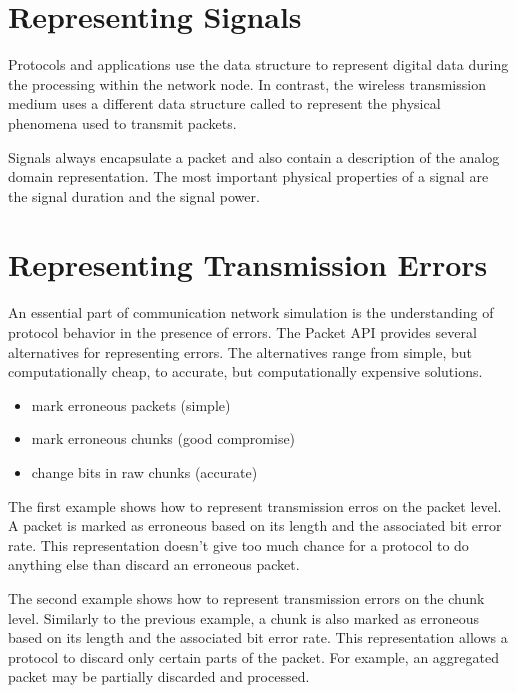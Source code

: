 
\section{Representing Signals}
\label{sec:packets:representing-signals}

Protocols and applications use the  data structure to represent
digital data during the processing within the network node. In contrast, the
wireless transmission medium uses a different data structure called
 to represent the physical phenomena used to transmit packets.


Signals always encapsulate a packet and also contain a description of the analog
domain representation. The most important physical properties of a signal are
the signal duration and the signal power.

\section{Representing Transmission Errors}
\label{sec:packets:representing-transmission-errors}

An essential part of communication network simulation is the understanding of
protocol behavior in the presence of errors. The Packet API provides several
alternatives for representing errors. The alternatives range from simple, but
computationally cheap, to accurate, but computationally expensive solutions.

\begin{itemize}
    \item mark erroneous packets (simple)
    \item mark erroneous chunks (good compromise)
    \item change bits in raw chunks (accurate)
\end{itemize}

The first example shows how to represent transmission erros on the packet level.
A packet is marked as erroneous based on its length and the associated bit error
rate. This representation doesn't give too much chance for a protocol to do
anything else than discard an erroneous packet.


The second example shows how to represent transmission errors on the chunk
level. Similarly to the previous example, a chunk is also marked as erroneous
based on its length and the associated bit error rate. This representation
allows a protocol to discard only certain parts of the packet. For example, an
aggregated packet may be partially discarded and processed.

